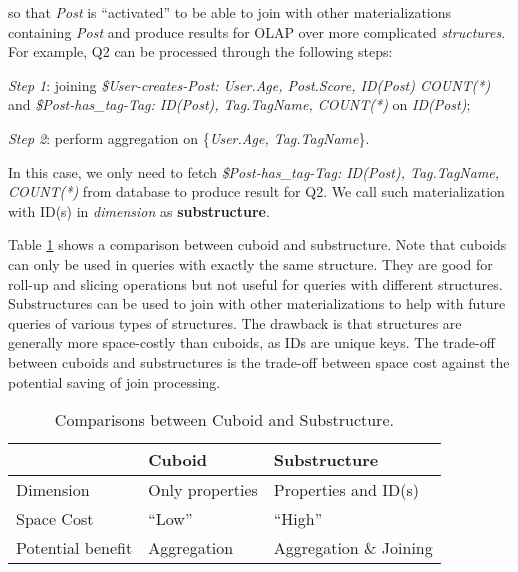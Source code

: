 
 \noindent so that \textit{Post} is ``activated'' to be able to join with other materializations containing \textit{Post} and produce results for OLAP over more complicated \textit{structures}. For example, Q2 can be processed through the following steps:


\noindent\emph{Step 1}: joining \textit{\$User-creates-Post: User.Age, Post.Score, ID(Post) COUNT(*)} and \textit{\$Post-has\_tag-Tag: ID(Post), Tag.TagName, COUNT(*)} on \emph{ID(Post)};

\noindent\emph{Step 2}: perform aggregation on \{\emph{User.Age, Tag.TagName}\}. 

In this case, we only need to fetch \textit{\$Post-has\_tag-Tag: ID(Post), Tag.TagName, COUNT(*)} from database to produce result for Q2. We call such materialization with ID(s) in \textit{dimension} as \textbf{substructure}. 

Table \ref{Table:3:1} shows a comparison between cuboid and substructure. Note that cuboids can only be used in queries with exactly the same structure. They are good for roll-up and slicing operations but not useful for queries with different structures. Substructures can be used to join with other materializations to help with future queries of various types of structures. The drawback is that structures are generally more space-costly than cuboids, as IDs are unique keys. The trade-off between cuboids and substructures is the trade-off between space cost against the potential saving of join processing.


\begin{table}
	\footnotesize
	\begin {center}
	\begin{tabular}{ | l | l | l |}
		\hline
		&Cuboid&Substructure\\ \hline
		Dimension& Only properties& Properties and ID(s)\\ \hline
		Space Cost& ``Low''&``High''\\ \hline
		Potential benefit& Aggregation& Aggregation \& Joining\\ \hline
	\end{tabular}
	\end {center}
	\caption{Comparisons between Cuboid and Substructure.}
	\label{Table:3:1}
\end{table}


